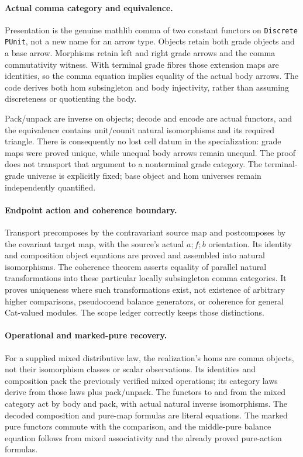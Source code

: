 \documentclass{article}
\begin{document}
\paragraph{Actual comma category and equivalence.}
Presentation is the genuine mathlib comma of two constant functors on \texttt{Discrete PUnit}, not a new name for an arrow type. Objects retain both grade objects and a base arrow. Morphisms retain left and right grade arrows and the comma commutativity witness. With terminal grade fibres those extension maps are identities, so the comma equation implies equality of the actual body arrows. The code derives both hom subsingleton and body injectivity, rather than assuming discreteness or quotienting the body.

Pack/unpack are inverse on objects; decode and encode are actual functors, and the equivalence contains unit/counit natural isomorphisms and its required triangle. There is consequently no lost cell datum in the specialization: grade maps were proved unique, while unequal body arrows remain unequal. The proof does not transport that argument to a nonterminal grade category. The terminal-grade universe is explicitly fixed; base object and hom universes remain independently quantified.

\paragraph{Endpoint action and coherence boundary.}
Transport precomposes by the contravariant source map and postcomposes by the covariant target map, with the source's actual $a;f;b$ orientation. Its identity and composition object equations are proved and assembled into natural isomorphisms. The coherence theorem asserts equality of parallel natural transformations into these particular locally subsingleton comma categories. It proves uniqueness where such transformations exist, not existence of arbitrary higher comparisons, pseudocoend balance generators, or coherence for general Cat-valued modules. The scope ledger correctly keeps those distinctions.

\paragraph{Operational and marked-pure recovery.}
For a supplied mixed distributive law, the realization's homs are comma objects, not their isomorphism classes or scalar observations. Its identities and composition pack the previously verified mixed operations; its category laws derive from those laws plus pack/unpack. The functors to and from the mixed category act by body and pack, with actual natural inverse isomorphisms. The decoded composition and pure-map formulas are literal equations. The marked pure functors commute with the comparison, and the middle-pure balance equation follows from mixed associativity and the already proved pure-action formulas.
\end{document}

